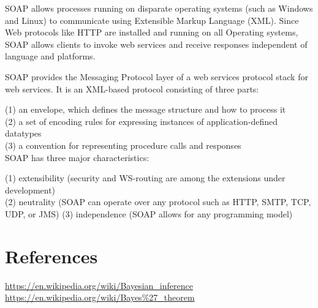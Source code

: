 \documentclass[11pt]{article}
\begin{document}
SOAP allows processes running on disparate operating systems (such as
Windows and Linux) to communicate using Extensible Markup Language
(XML). Since Web protocols like HTTP are installed and running on all
Operating systems, SOAP allows clients to invoke web services and
receive responses independent of language and platforms.

SOAP provides the Messaging Protocol layer of a web services protocol stack for web services. It is an XML-based protocol consisting of three parts:

(1) an envelope, which defines the message structure and how to process it\\
(2) a set of encoding rules for expressing instances of application-defined datatypes\\
(3) a convention for representing procedure calls and responses\\

SOAP has three major characteristics:

(1) extensibility (security and WS-routing are among the extensions under development)\\
(2) neutrality (SOAP can operate over any protocol such as HTTP, SMTP, TCP, UDP, or JMS)
(3) independence (SOAP allows for any programming model)












\section{References}
\href{https://en.wikipedia.org/wiki/Bayesian\_inference}{https://en.wikipedia.org/wiki/Bayesian\_inference}\\
\href{hrefhttps://en.wikipedia.org/wiki/Bayes\%27\_theorem}{https://en.wikipedia.org/wiki/Bayes\%27\_theorem}\\

\citet{Croom04}



\end{document}
